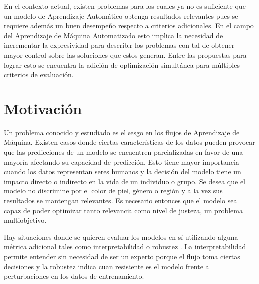 
En el contexto actual, existen problemas para los cuales ya no es suficiente que un modelo de Aprendizaje Autom\'atico obtenga resultados relevantes pues se requiere adem\'as un buen desempe\~no respecto a criterios adicionales. En el campo del Aprendizaje de M\'aquina Automatizado esto implica la necesidad de incrementar la expresividad para describir los problemas con tal de obtener mayor control sobre las soluciones que estos generan. Entre las propuestas para lograr esto se encuentra la adici\'on de optimizaci\'on simult\'anea para m\'ultiples criterios de evaluaci\'on.   

\section*{Motivaci\'on}
Un problema conocido y estudiado es el sesgo en los flujos de Aprendizaje de M\'aquina. Existen casos donde ciertas caracter\'isticas de los datos pueden provocar que las predicciones de un modelo se encuentren parcializadas en favor de una mayor\'ia   afectando su capacidad de predicci\'on. Esto tiene mayor importancia cuando los datos representan seres humanos y la decisi\'on del modelo tiene un impacto directo o indirecto en la vida de un individuo o grupo. Se desea que el modelo no discrimine por el color de piel, g\'enero o regi\'on y a la vez sus resultados se mantengan relevantes. Es necesario entonces que el modelo sea capaz de poder optimizar tanto  relevancia como  nivel de justeza, un problema multiobjetivo.

Hay situaciones donde se quieren evaluar los modelos en s\'i utilizando alguna m\'etrica adicional tales como interpretabilidad  o robustez . La interpretabilidad permite entender sin necesidad de ser un experto porque el flujo toma ciertas decisiones y la robustez indica cuan resistente es el modelo frente a perturbaciones en los datos de entrenamiento. 


